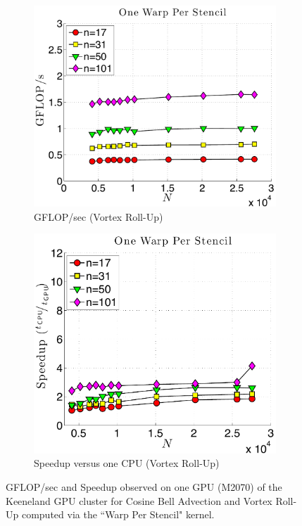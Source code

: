 \begin{figure}
\begin{subfigure}[t]{0.46\textwidth}
\includegraphics[width=\textwidth]{../figures/keeneland_results/alltoallv_vortex/gflops_gpu_1proc_oneWarpPerStencil.pdf}
\caption{GFLOP/sec (Vortex Roll-Up)}
\label{fig:gflops_gpu_1proc_oneWarp_keeneland_vortex}
\end{subfigure} 
\quad
\begin{subfigure}[t]{0.425\textwidth}
\includegraphics[width=\textwidth]{../figures/keeneland_results/alltoallv_vortex/speedup_1proc_oneWarpPerStencil.pdf}
\caption{Speedup versus one CPU (Vortex Roll-Up)}
\label{fig:speedup_1proc_oneWarp_keeneland_vortex}
\end{subfigure} 
\caption{GFLOP/sec and Speedup observed on one GPU (M2070) of the Keeneland GPU cluster for Cosine Bell Advection and Vortex Roll-Up computed via the ``Warp Per Stencil" kernel.}
\end{figure} 

